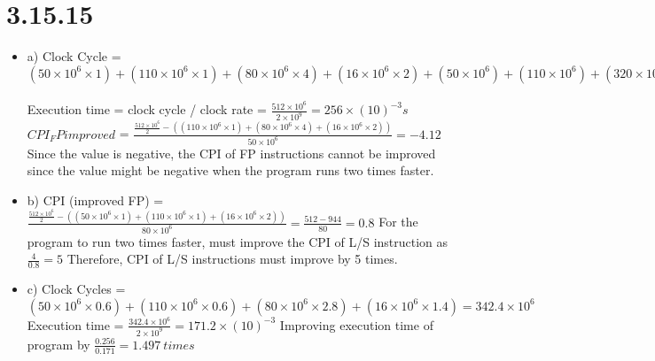 \documentclass{article}
\begin{document}
\section{3.15.15} 
\begin{itemize}
    \item a) Clock Cycle = $(50 \times 10^6 \times 1) + (110 \times 10^6 \times 1) + (80 \times 10^6 \times 4) + (16 \times 10^6 \times 2) + (50 \times 10^6) + (110 \times 10^6) + (320 \times 10^6) + (32 \times 10^6) = 512 \times 10^6 s$\newline
    \ \\
    Execution time = clock cycle / clock rate = $\frac{512 \times 10^6}{2 \times 10^9} = 256 \times (10)^{-3}s$ 
    \ \\
    $CPI_FPimproved$ =  $\frac{\frac{512 \times 10^6}{2} - ((110 \times 10^6 \times 1) + (80 \times 10^6 \times 4) + (16 \times 10^6 \times 2))}{50 \times 10^6} = -4.12$\newline
    Since the value is negative, the CPI of FP instructions cannot be improved since the value might be negative when the program runs two times faster. 
    \item b) CPI (improved FP) =  $\frac{\frac{512 \times 10^6}{2} - ((50 \times 10^6 \times 1) + (110 \times 10^6 \times 1) + (16 \times 10^6 \times 2))}{80 \times 10^6} = \frac{512 - 944}{80} = 0.8$\newline
    For the program to run two times faster, must improve the CPI of L/S instruction as $\frac{4}{0.8} = 5$\newline
    Therefore, CPI of L/S instructions must improve by 5 times.
    \item c) Clock Cycles = $(50 \times 10^6 \times 0.6) + (110 \times 10^6 \times 0.6) + (80 \times 10^6 \times 2.8) + (16 \times 10^6 \times 1.4) = 342.4 \times 10^6$\newline
    Execution time = $\frac{342.4 \times 10^6}{2 \times 10^9} = 171.2 \times (10)^{-3}$\newline
    Improving execution time of program by $\frac{0.256}{0.171} = 1.497\ times$
\end{itemize}
\end{document}
